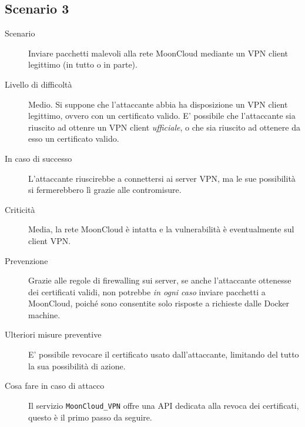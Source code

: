 \subsection{Scenario 3}
\begin{description}
    \item[Scenario]Inviare pacchetti malevoli alla rete MoonCloud
    mediante un VPN client legittimo (in tutto o in parte).
    \item[Livello di difficoltà]Medio. Si suppone che l'attaccante abbia
    ha disposizione un VPN client legittimo, ovvero con un certificato
    valido. E' possibile che l'attaccante sia riuscito ad ottenre un
    VPN client \textit{ufficiale}, o che sia riuscito ad ottenere
    da esso
    un certificato valido.
    \item[In caso di successo]L'attaccante riuscirebbe a connettersi
    ai server VPN, ma le sue possibilità si fermerebbero lì grazie
    alle contromisure.
    \item[Criticità]Media, la rete MoonCloud è intatta e la vulnerabilità
    è eventualmente sul client VPN.
    \item[Prevenzione]Grazie alle regole di firewalling sui server,
    se anche l'attaccante ottenesse dei certificati validi, non
    potrebbe \textit{in ogni caso} inviare pacchetti a MoonCloud, poiché
    sono consentite solo risposte a richieste dalle Docker machine. 
    \item[Ulteriori misure preventive]E' possibile revocare il certificato
    usato dall'attaccante, limitando del tutto la sua possibilità di azione.
    \item[Cosa fare in caso di attacco]Il servizio  \texttt{MoonCloud\_VPN}
    offre una API dedicata alla revoca dei certificati, questo è il primo
    passo da seguire.
\end{description}


